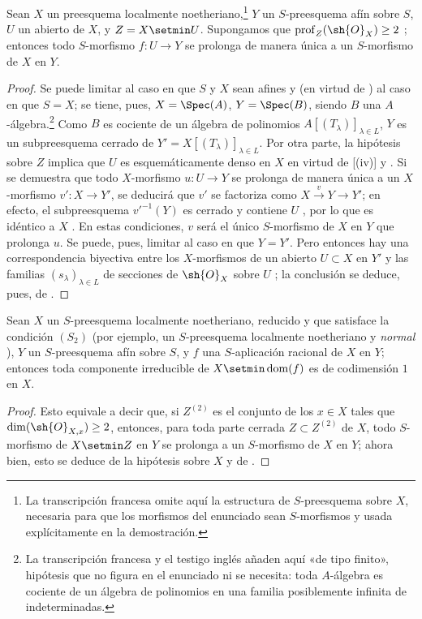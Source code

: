 \begin{proposition}[20.4.11]
\label{IV.20.4.11}
Sean $X$ un preesquema localmente noetheriano,\footnote{La transcripción francesa omite aquí la estructura de $S$-preesquema sobre $X$, necesaria para que los morfismos del enunciado sean $S$-morfismos y usada explícitamente en la demostración.} $Y$ un $S$-preesquema afín sobre $S$, $U$ un abierto de $X$, y $Z=X\setmin U$.
Supongamos que $\operatorname{prof}_Z(\sh{O}_X)\geq 2$ ; entonces todo $S$-morfismo $f:U\to Y$ se prolonga de manera única a un $S$-morfismo de $X$ en $Y$.
\end{proposition}

\begin{proof}
Se puede limitar al caso en que $S$ y $X$ sean afines y (en virtud de ) al caso en que $S=X$; se tiene, pues, $X=\Spec(A)$, $Y=\Spec(B)$, siendo $B$ una $A$-álgebra.\footnote{La transcripción francesa y el testigo inglés añaden aquí «de tipo finito», hipótesis que no figura en el enunciado ni se necesita: toda $A$-álgebra es cociente de un álgebra de polinomios en una familia posiblemente infinita de indeterminadas.}
Como $B$ es cociente de un álgebra de polinomios $A[(T_\lambda)]_{\lambda\in L}$, $Y$ es un subpreesquema cerrado de $Y'=X[(T_\lambda)]_{\lambda\in L}$.
Por otra parte, la hipótesis sobre $Z$ implica que $U$ es esquemáticamente denso en $X$ en virtud de [(iv)] y .
Si se demuestra que todo $X$-morfismo $u:U\to Y$ se prolonga de manera única a un $X$-morfismo $v':X\to Y'$, se deducirá que $v'$ se factoriza como $X\xrightarrow{v}Y\to Y'$; en efecto, el subpreesquema $v'^{-1}(Y)$ es cerrado y contiene $U$ , por lo que es idéntico a $X$ .
En estas condiciones, $v$ será el único $S$-morfismo de $X$ en $Y$ que prolonga $u$.
Se puede, pues, limitar al caso en que $Y=Y'$.
Pero entonces hay una correspondencia biyectiva entre los $X$-morfismos de un abierto $U\subset X$ en $Y'$ y las familias $(s_\lambda)_{\lambda\in L}$ de secciones de $\sh{O}_X$ sobre $U$ ; la conclusión se deduce, pues, de .
\end{proof}

\begin{corollary}[20.4.12]
\label{IV.20.4.12}
Sean $X$ un $S$-preesquema localmente noetheriano, reducido y que satisface la condición $(S_2)$  \textup{(por ejemplo, un $S$-preesquema localmente noetheriano y \emph{normal} )}, $Y$ un $S$-preesquema afín sobre $S$, y $f$ una $S$-aplicación racional de $X$ en $Y$; entonces toda componente irreducible de $X\setmin\operatorname{dom}(f)$ es de codimensión $1$ en $X$.
\end{corollary}

\begin{proof}
Esto equivale a decir que, si $Z^{(2)}$ es el conjunto de los $x\in X$ tales que $\dim(\sh{O}_{X,x})\geq 2$, entonces, para toda parte cerrada $Z\subset Z^{(2)}$ de $X$, todo $S$-morfismo de $X\setmin Z$ en $Y$ se prolonga a un $S$-morfismo de $X$ en $Y$; ahora bien, esto se deduce de la hipótesis sobre $X$  y de .
\end{proof}
